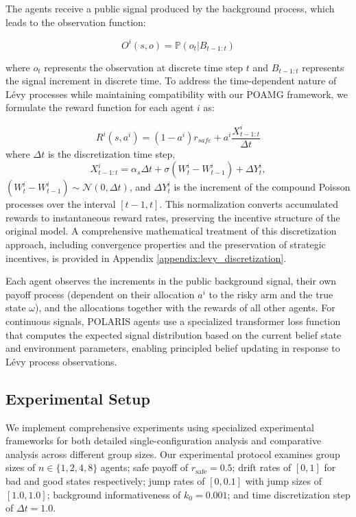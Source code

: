 The agents receive a public signal produced by the background process, which leads to the observation function:

\begin{equation}
    O^i(s, o) = \mathbb{P}(o_t | B_{t-1:t})
\end{equation}

where $o_t$ represents the observation at discrete time step $t$ and $B_{t-1:t}$ represents the signal increment in discrete time. To address the time-dependent nature of Lévy processes while maintaining compatibility with our POAMG framework, we formulate the reward function for each agent $i$ as:

\begin{equation}
    R^i(s, a^i) = (1-a^i)r_\textit{safe} + a^i \frac{X^i_{t-1:t}}{\Delta t}
\end{equation}
where $\Delta t$ is the discretization time step,
\begin{equation}
    X^i_{t-1:t} = \alpha_s \Delta t + \sigma (W^i_t - W^i_{t-1}) + \Delta Y^i_t,
\end{equation}
$(W^i_t - W^i_{t-1}) \sim \mathcal{N}(0, \Delta t)$, and $\Delta Y^i_t$ is the increment of the compound Poisson processes over the interval $[t-1, t]$.
This normalization converts accumulated rewards to instantaneous reward rates, preserving the incentive structure of the original model. A comprehensive mathematical treatment of this discretization approach, including convergence properties and the preservation of strategic incentives, is provided in Appendix \ref{appendix:levy_discretization}.

Each agent observes the increments in the public background signal, their own payoff process (dependent on their allocation $a^i$ to the risky arm and the true state $\omega$), and the allocations together with the rewards of all other agents. For continuous signals, POLARIS agents use a specialized transformer loss function that computes the expected signal distribution based on the current belief state and environment parameters, enabling principled belief updating in response to Lévy process observations.

\subsection{Experimental Setup}

We implement comprehensive experiments using specialized experimental frameworks for both detailed single-configuration analysis and comparative analysis across different group sizes. Our experimental protocol examines group sizes of $n \in \{1, 2, 4, 8\}$ agents; safe payoff of $r_{\text{safe}} = 0.5$; drift rates of $[0, 1]$ for bad and good states respectively; jump rates of $[0, 0.1]$ with jump sizes of $[1.0, 1.0]$; background informativeness of $k_0 = 0.001$; and time discretization step of $\Delta t = 1.0$.

